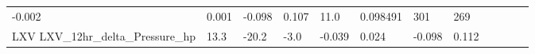 \documentclass[11pt]{article}
\begin{document}
\begin{longtable}[]{@{}llllllllllll@{}}
\begin{minipage}[t]{0.04\columnwidth}
-0.002\strut
\end{minipage} & \begin{minipage}[t]{0.05\columnwidth}\raggedright\strut
0.001\strut
\end{minipage} & \begin{minipage}[t]{0.04\columnwidth}\raggedright\strut
-0.098\strut
\end{minipage} & \begin{minipage}[t]{0.04\columnwidth}\raggedright\strut
0.107\strut
\end{minipage} & \begin{minipage}[t]{0.05\columnwidth}\raggedright\strut
11.0\strut
\end{minipage} & \begin{minipage}[t]{0.05\columnwidth}\raggedright\strut
0.098491\strut
\end{minipage} & \begin{minipage}[t]{0.05\columnwidth}\raggedright\strut
301\strut
\end{minipage} & \begin{minipage}[t]{0.07\columnwidth}\raggedright\strut
269\strut
\end{minipage}\tabularnewline
\begin{minipage}[t]{0.18\columnwidth}\raggedright\strut
LXV LXV\_12hr\_delta\_Pressure\_hp\strut
\end{minipage} & \begin{minipage}[t]{0.04\columnwidth}\raggedright\strut
13.3\strut
\end{minipage} & \begin{minipage}[t]{0.04\columnwidth}\raggedright\strut
-20.2\strut
\end{minipage} & \begin{minipage}[t]{0.04\columnwidth}\raggedright\strut
-3.0\strut
\end{minipage} & \begin{minipage}[t]{0.04\columnwidth}\raggedright\strut
-0.039\strut
\end{minipage} & \begin{minipage}[t]{0.05\columnwidth}\raggedright\strut
0.024\strut
\end{minipage} & \begin{minipage}[t]{0.04\columnwidth}\raggedright\strut
-0.098\strut
\end{minipage} & \begin{minipage}[t]{0.04\columnwidth}\raggedright\strut
0.112\strut
\end{minipage} & \begin{minipage}[t]{0.05\columnwidth}\raggedright\strut

\end{minipage}
\end{longtable}
\end{document}
